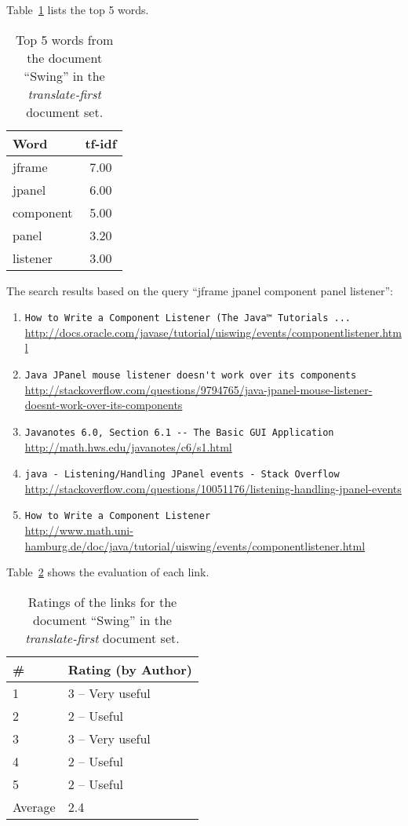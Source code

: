 Table~\ref{tab:topWords-en-swing} lists the top 5 words.
\begin{table}[H]
\centering
\begin{tabular}{|l|c|}
\hline\hline
    Word & tf-idf \\
\hline
    jframe & 7.00 \\
    jpanel & 6.00 \\
    component & 5.00 \\
    panel & 3.20 \\
    listener & 3.00 \\
\hline\hline
\end{tabular}
\caption{Top 5 words from the document ``Swing'' in the \textit{translate-first} document set.}
\label{tab:topWords-en-swing}
\end{table}

The search results based on the query ``jframe jpanel component panel listener'':

\begin{enumerate}
\item
    \verb|How to Write a Component Listener (The Java™ Tutorials ...| \\
    \url{http://docs.oracle.com/javase/tutorial/uiswing/events/componentlistener.html}
\item
    \verb|Java JPanel mouse listener doesn't work over its components| \\
    \url{http://stackoverflow.com/questions/9794765/java-jpanel-mouse-listener-doesnt-work-over-its-components}
\item
    \verb|Javanotes 6.0, Section 6.1 -- The Basic GUI Application| \\
    \url{http://math.hws.edu/javanotes/c6/s1.html}
\item
    \verb|java - Listening/Handling JPanel events - Stack Overflow| \\
    \url{http://stackoverflow.com/questions/10051176/listening-handling-jpanel-events}
\item
    \verb|How to Write a Component Listener| \\
    \url{http://www.math.uni-hamburg.de/doc/java/tutorial/uiswing/events/componentlistener.html}
\end{enumerate}

Table~\ref{tab:ratings-en-swing} shows the evaluation of each link.
\begin{table}[H]
\centering
\begin{tabular}{|l|l|}
\hline\hline
    \# & Rating (by Author) \\
\hline
    1 & 3 -- Very useful \\
    2 & 2 -- Useful \\
    3 & 3 -- Very useful \\
    4 & 2 -- Useful \\
    5 & 2 -- Useful \\
\hline
    Average & 2.4 \\
\hline\hline
\end{tabular}
\caption{Ratings of the links for the document ``Swing'' in the \textit{translate-first} document set.}
\label{tab:ratings-en-swing}
\end{table}


